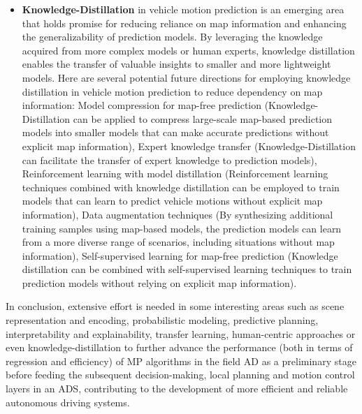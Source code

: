 \begin{itemize}
	\item \textbf{Knowledge-Distillation} in vehicle motion prediction is an emerging area that holds promise for reducing reliance on map information and enhancing the generalizability of prediction models. By leveraging the knowledge acquired from more complex models or human experts, knowledge distillation enables the transfer of valuable insights to smaller and more lightweight models. Here are several potential future directions for employing knowledge distillation in vehicle motion prediction to reduce dependency on map information: Model compression for map-free prediction (Knowledge-Distillation can be applied to compress large-scale map-based prediction models into smaller models that can make accurate predictions without explicit map information), Expert knowledge transfer (Knowledge-Distillation can facilitate the transfer of expert knowledge to prediction models), Reinforcement learning with model distillation (Reinforcement learning techniques combined with knowledge distillation can be employed to train models that can learn to predict vehicle motions without explicit map information), Data augmentation techniques (By synthesizing additional training samples using map-based models, the prediction models can learn from a more diverse range of scenarios, including situations without map information), Self-supervised learning for map-free prediction (Knowledge distillation can be combined with self-supervised learning techniques to train prediction models without relying on explicit map information).
\end{itemize}

In conclusion, extensive effort is needed in some interesting areas such as scene representation and encoding, probabilistic modeling, predictive planning, interpretability and explainability, transfer learning, human-centric approaches or even knowledge-distillation to further advance the performance (both in terms of regression and efficiency) of \ac{MP} algorithms in the field \ac{AD} as a preliminary stage before feeding the subsequent decision-making, local planning and motion control layers in an \ac{ADS}, contributing to the development of more efficient and reliable autonomous driving systems.

